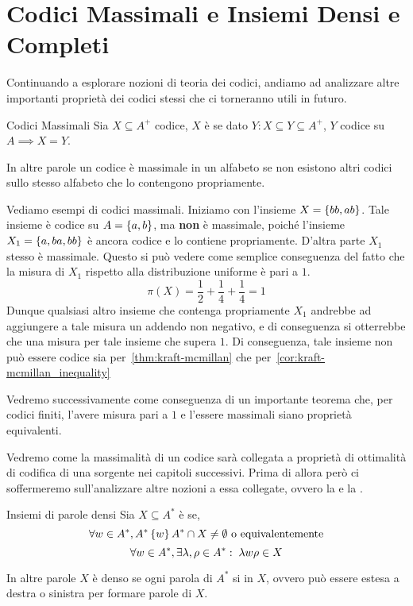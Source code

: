 \section{Codici Massimali e Insiemi Densi e Completi}

Continuando a esplorare nozioni di teoria dei codici, andiamo ad analizzare altre importanti proprietà dei codici stessi che ci torneranno utili in futuro.

\begin{definition}{Codici Massimali}
  Sia \(X \subseteq A^+\) codice, \(X\) è  se dato \(Y: X\subseteq Y \subseteq A^+\), \(Y\) codice su \(A \implies X = Y\).

  In altre parole un codice è massimale in un alfabeto se non esistono altri codici sullo stesso alfabeto che lo contengono propriamente.
\end{definition}

\begin{example}{}
  Vediamo esempi di codici massimali.
  Iniziamo con l'insieme \(X = \set{bb,ab}\). Tale insieme è codice su \(A = \set{a,b}\), ma \textbf{non} è massimale, poiché l'insieme \(X_1 = \set{a,ba,bb}\) è ancora codice e lo contiene propriamente.
  D'altra parte \(X_1\) stesso è massimale. Questo si può vedere come semplice conseguenza del fatto che la misura di \(X_1\) rispetto alla distribuzione uniforme è pari a \(1\).
  \[\pi(X) = \frac{1}{2} + \frac{1}{4} + \frac{1}{4} = 1\]
  Dunque qualsiasi altro insieme che contenga propriamente \(X_1\) andrebbe ad aggiungere a tale misura un addendo non negativo, e di conseguenza si otterrebbe che una misura per tale insieme che supera \(1\).
  Di conseguenza, tale insieme non può essere codice sia per~\ref{thm:kraft-mcmillan} che per~\ref{cor:kraft-mcmillan_inequality}

  Vedremo successivamente come conseguenza di un importante teorema che, per codici finiti, l'avere misura pari a \(1\) e l'essere massimali siano proprietà equivalenti.
\end{example}

Vedremo come la massimalità di un codice sarà collegata a proprietà di ottimalità di codifica di una sorgente nei capitoli successivi.
Prima di allora però ci soffermeremo sull'analizzare altre nozioni a essa collegate, ovvero la  e la .

\begin{definition}{Insiemi di parole densi}
  Sia \(X \subseteq A^*\) è  se, 
  \[\forall w \in A^*,A^*\set{w}A^* \cap X \neq \emptyset \text{ o equivalentemente}\]
  \[\forall w \in A^*, \exists \lambda,\rho\in A^* :\; \lambda w \rho \in X\]

  In altre parole \(X\) è denso se ogni parola di \(A^*\) si  in \(X\), ovvero può essere estesa a destra o sinistra per formare parole di \(X\).
\end{definition}


